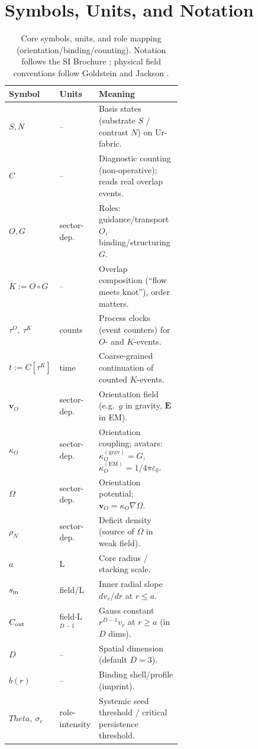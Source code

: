 \documentclass[12pt,a4paper,oneside]{scrreprt}
\def\Theta{Theta}%
\begin{document}
\chapter{Symbols, Units, and Notation}\label{app:symbols}
\begin{table}[htbp]\centering
\caption{Core symbols, units, and role mapping (orientation/binding/counting). 
Notation follows the SI Brochure \cite{bipm2019si}; physical field conventions follow Goldstein \cite{goldstein2002classical} and Jackson \cite{jackson1999classical}.}
\begin{tabular}{llp{0.58\linewidth}}\toprule
Symbol & Units & Meaning \\ \midrule
$S,N$ & – & Basis states (substrate $S$ / contrast $N$) on Ur-fabric.\\
$C$ & – & Diagnostic counting (non-operative); reads real overlap events.\\
$O,G$ & sector-dep. & Roles: guidance/transport $O$, binding/structuring $G$.\\
$K:=O\!\circ G$ & – & Overlap composition (“flow meets knot”), order matters.\\
$\tau^O,\ \tau^K$ & counts & Process clocks (event counters) for $O$- and $K$-events.\\
$t:=C[\tau^K]$ & time & Coarse-grained continuation of counted $K$-events.\\
$\mathbf v_O$ & sector-dep. & Orientation field (e.g.\ $g$ in gravity, $\mathbf E$ in EM).\\
$\kappa_O$ & sector-dep. & Orientation coupling; avatars: $\kappa_O^{(\mathrm{grav})}=G$, $\kappa_O^{(\mathrm{EM})}=1/4\pi\varepsilon_0$.\\
$\Omega$ & sector-dep. & Orientation potential; $\mathbf v_O=\kappa_O\nabla\Omega$.\\
$\rho_N$ & sector-dep. & Deficit density (source of $\Omega$ in weak field).\\
$a$ & L & Core radius / stacking scale.\\
$s_{\rm in}$ & field/L & Inner radial slope $dv_r/dr$ at $r\le a$.\\
$C_{\rm out}$ & field$\cdot$L$^{D-1}$ & Gauss constant $r^{D-1}v_r$ at $r\ge a$ (in $D$ dims).\\
$D$ & – & Spatial dimension (default $D=3$).\\
$b(r)$ & – & Binding shell/profile (imprint).\\
$\Theta,\ \sigma_c$ & role-intensity & Systemic seed threshold / critical persistence threshold.\\

\end{tabular}
\end{table}
\end{document}

